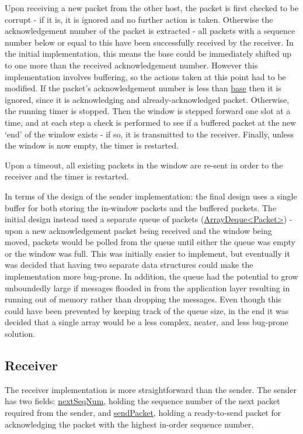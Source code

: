 \documentclass[a4paper]{article}
\newcommand{\code}{\url}
\begin{document}
Upon receiving a new packet from the other host, the packet is first checked to be corrupt - if it is, it is ignored and no further action is taken. Otherwise the acknowledgement number of the packet is extracted - all packets with a sequence number below or equal to this have been successfully received by the receiver. In the initial implementation, this means the base could be immediately shifted up to one more than the received acknowledgement number. However this implementation involves buffering, so the actions taken at this point had to be modified. If the packet's acknowledgement number is less than \code{base} then it is ignored, since it is acknowledging and already-acknowledged packet. Otherwise, the running timer is stopped. Then the window is stepped forward one slot at a time, and at each step a check is performed to see if a buffered packet at the new `end' of the window exists - if so, it is transmitted to the receiver. Finally, unless the window is now empty, the timer is restarted.

Upon a timeout, all existing packets in the window are re-sent in order to the receiver and the timer is restarted.

In terms of the design of the sender implementation: the final design uses a single buffer for both storing the in-window packets and the buffered packets. The initial design instead used a separate queue of packets (\code{ArrayDeque<Packet>}) - upon a new acknowledgement packet being received and the window being moved, packets would be polled from the queue until either the queue was empty or the window was full. This was initially easier to implement, but eventually it was decided that having two separate data structures could make the implementation more bug-prone. In addition, the queue had the potential to grow unboundedly large if messages flooded in from the application layer resulting in running out of memory rather than dropping the messages. Even though this could have been prevented by keeping track of the queue size, in the end it was decided that a single array would be a less complex, neater, and less bug-prone solution.


\subsection{Receiver}

The receiver implementation is more straightforward than the sender. The sender has two fields: \code{nextSeqNum}, holding the sequence number of the next packet required from the sender, and \code{sendPacket}, holding a ready-to-send packet for acknowledging the packet with the highest in-order sequence number.
\end{document}
